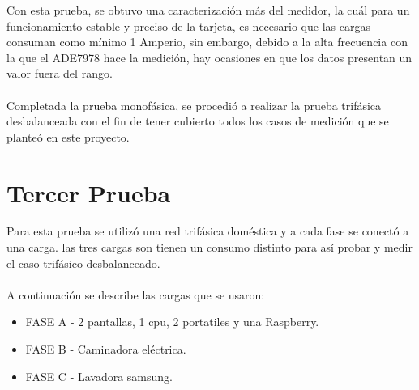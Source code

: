   Con esta prueba, se obtuvo una caracterización más del medidor, la cuál para un funcionamiento estable y preciso de la tarjeta, es necesario que las cargas consuman como mínimo 1 Amperio, sin embargo, debido a la alta frecuencia con la que el ADE7978 hace la medición, hay ocasiones en que los datos presentan un valor fuera del rango. \\\\
  Completada la prueba monofásica, se procedió a realizar la prueba trifásica desbalanceada con el fin de tener cubierto todos los casos de medición que se planteó en este proyecto.
  \section{Tercer Prueba}

  Para esta prueba se utilizó una red trifásica doméstica y a cada fase se conectó a una carga. las tres cargas son tienen un consumo distinto para así probar y medir el caso trifásico desbalanceado.\\\\
  A continuación se describe las cargas que se usaron:\\
  \begin{itemize}
    \itemsep0em
    \item FASE A - 2 pantallas, 1 cpu, 2 portatiles y una Raspberry.
    \item FASE B - Caminadora eléctrica.
    \item FASE C - Lavadora samsung.
  \end{itemize}
